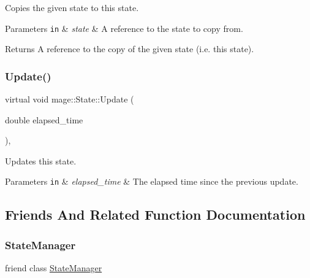 Copies the given state to this state.


\begin{DoxyParams}[1]{Parameters}
\mbox{\tt in}  & {\em state} & A reference to the state to copy from. \\
\hline
\end{DoxyParams}
\begin{DoxyReturn}{Returns}
A reference to the copy of the given state (i.\+e. this state). 
\end{DoxyReturn}
\hypertarget{classmage_1_1_state_afbee8caa84e0c69ac5757f7e5e87317f}{}\label{classmage_1_1_state_afbee8caa84e0c69ac5757f7e5e87317f} 
\subsubsection{\texorpdfstring{Update()}{Update()}}
{\footnotesize\ttfamily virtual void mage\+::\+State\+::\+Update (\begin{DoxyParamCaption}\item[{double}]{elapsed\+\_\+time }\end{DoxyParamCaption})\hspace{0.3cm}{\ttfamily [protected]}, {\ttfamily [virtual]}}

Updates this state.


\begin{DoxyParams}[1]{Parameters}
\mbox{\tt in}  & {\em elapsed\+\_\+time} & The elapsed time since the previous update. \\
\hline
\end{DoxyParams}


\subsection{Friends And Related Function Documentation}
\hypertarget{classmage_1_1_state_a8055e77bf0267832ef337718a11fec0d}{}\label{classmage_1_1_state_a8055e77bf0267832ef337718a11fec0d} 
\subsubsection{\texorpdfstring{State\+Manager}{StateManager}}
{\footnotesize\ttfamily friend class \hyperlink{classmage_1_1_state_manager}{State\+Manager}\hspace{0.3cm}{\ttfamily [friend]}}



